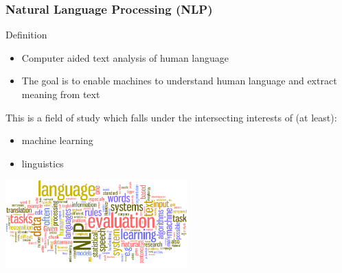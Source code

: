 \documentclass{beamer}
\begin{document}
\begin{frame}

	\frametitle{Natural Language Processing (NLP)}
	
	\begin{block}{Definition}
	\begin{itemize}
		\item Computer aided text analysis of human language
		\item The goal is to enable machines to understand human language and extract meaning from text
	\end{itemize}
	\end{block}
	
	This is a field of study which falls under the intersecting interests of (at least):
	\begin{itemize}
		\item machine learning
		\item linguistics
	\end{itemize}

\centerline{\includegraphics[width=7cm]{./figs/NLPTM_wordcloud.png}}

\end{frame}
\end{document}
